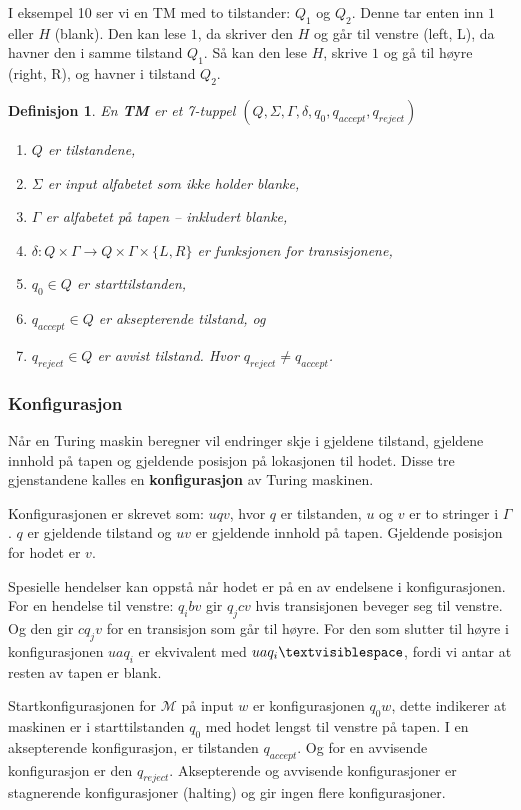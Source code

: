 \documentclass[11pt,a4paper]{article}
\begin{document}
I eksempel 10 ser vi en TM med to tilstander: $Q_1$ og $Q_2$. Denne tar enten inn $1$ eller $H$ (blank). Den kan lese $1$, da skriver den $H$ og går til venstre (left, L), da havner den i samme tilstand $Q_1$. Så kan den lese $H$, skrive $1$ og gå til høyre (right, R), og havner i tilstand $Q_2$.

\theoremstyle{mytheoremstyle}
\newtheorem{tm}{Definisjon}[section]
\begin{tm}
En \textbf{TM} er et 7-tuppel $(Q, \Sigma, \Gamma, \delta, q_0, q_{accept}, q_{reject})$
\begin{enumerate}
	\item{$Q$ er tilstandene,}
	\item{$\Sigma$ er input alfabetet som ikke holder blanke,}
	\item{$\Gamma$ er alfabetet på tapen -- inkludert blanke,}
	\item{$\delta : Q \times \Gamma \rightarrow Q \times \Gamma \times \{L, R\}$ er funksjonen for transisjonene,}
	\item{$q_0 \in Q$ er starttilstanden,}
	\item{$q_{accept} \in Q$ er aksepterende tilstand, og}
	\item{$q_{reject} \in Q$ er avvist tilstand. Hvor $q_{reject} \neq q_{accept}$}.
\end{enumerate}
\end{tm}

\subsubsection{Konfigurasjon}
Når en Turing maskin beregner vil endringer skje i gjeldene tilstand, gjeldene innhold på tapen og gjeldende posisjon på lokasjonen til hodet. Disse tre gjenstandene kalles en \textbf{konfigurasjon} av Turing maskinen.

Konfigurasjonen er skrevet som: $uqv$, hvor $q$ er tilstanden, $u$ og $v$ er to stringer i $\Gamma$. $q$ er gjeldende tilstand og $uv$ er gjeldende innhold på tapen. Gjeldende posisjon for hodet er $v$.

Spesielle hendelser kan oppstå når hodet er på en av endelsene i konfigurasjonen. For en hendelse til venstre: $q_ibv$ gir $q_jcv$ hvis transisjonen beveger seg til venstre. Og den gir $cq_jv$ for en transisjon som går til høyre. For den som slutter til høyre i konfigurasjonen $uaq_i$ er ekvivalent med $uaq_i\textvisiblespace$, fordi vi antar at resten av tapen er blank.

Startkonfigurasjonen for $\mathcal{M}$ på input $w$ er konfigurasjonen $q_0w$, dette indikerer at maskinen er i starttilstanden $q_0$ med hodet lengst til venstre på tapen. I en aksepterende konfigurasjon, er tilstanden $q_{accept}$. Og for en avvisende konfigurasjon er den $q_{reject}$. Aksepterende og avvisende konfigurasjoner er stagnerende konfigurasjoner (halting) og gir ingen flere konfigurasjoner.
\end{document}
